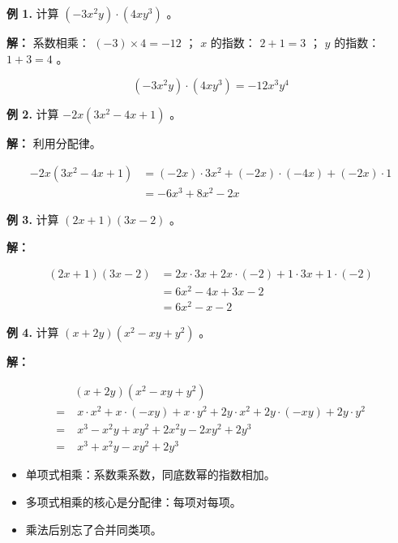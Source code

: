 \begin{workedexamples}


\textbf{例 1.} 计算 $(-3x^2y) \cdot (4xy^3)$ 。

\textbf{解：} 系数相乘： $(-3) \times 4 = -12$ ； $x$ 的指数： $2 + 1 = 3$ ； $y$ 的指数： $1 + 3 = 4$ 。

\[
(-3x^2y) \cdot (4xy^3) = -12x^3y^4
\]


\textbf{例 2.} 计算 $-2x(3x^2 - 4x + 1)$ 。

\textbf{解：} 利用分配律。

\[
\begin{aligned}
-2x(3x^2 - 4x + 1) &= (-2x) \cdot 3x^2 + (-2x) \cdot (-4x) + (-2x) \cdot 1 \\
&= -6x^3 + 8x^2 - 2x
\end{aligned}
\]


\textbf{例 3.} 计算 $(2x + 1)(3x - 2)$ 。

\textbf{解：}

\[
\begin{aligned}
(2x + 1)(3x - 2) &= 2x \cdot 3x + 2x \cdot (-2) + 1 \cdot 3x + 1 \cdot (-2) \\
&= 6x^2 - 4x + 3x - 2 \\
&= 6x^2 - x - 2
\end{aligned}
\]


\textbf{例 4.} 计算 $(x + 2y)(x^2 - xy + y^2)$ 。

\textbf{解：}

\[
\begin{aligned}
&(x + 2y)(x^2 - xy + y^2) \\
= &\; x \cdot x^2 + x \cdot (-xy) + x \cdot y^2 + 2y \cdot x^2 + 2y \cdot (-xy) + 2y \cdot y^2 \\
= &\; x^3 - x^2y + xy^2 + 2x^2y - 2xy^2 + 2y^3 \\
= &\; x^3 + x^2y - xy^2 + 2y^3
\end{aligned}
\]


\end{workedexamples}

\begin{keytakeaway}


\begin{itemize}
  \item 单项式相乘：系数乘系数，同底数幂的指数相加。
  \item 多项式相乘的核心是分配律：每项对每项。
  \item 乘法后别忘了合并同类项。
\end{itemize}


\end{keytakeaway}

